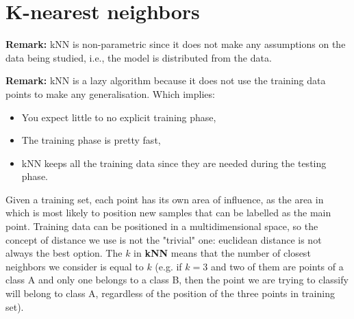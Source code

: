 \chapter{K-nearest neighbors}
\label{cha:KNN}


\textbf{Remark:} kNN is non-parametric since it does not make any assumptions on
the data being studied, i.e., the model is distributed from the data.
\newline

\textbf{Remark:} kNN is a lazy algorithm because it does not use the training data
points to make any generalisation. Which implies:
\begin{itemize}
	\item You expect little to no explicit training phase,

	\item The training phase is pretty fast,

	\item kNN keeps all the training data since they are needed during the testing
		phase.
\end{itemize}

Given a training set, each point has its own area of influence, as the area in
which is most likely to position new samples that can be labelled as the main
point. Training data can be positioned in a multidimensional space, so the
concept of distance we use is not the "trivial" one: euclidean distance is not always
the best option. The $k$ in \textbf{kNN} means that the number of closest neighbors
we consider is equal to $k$ (e.g. if $k=3$ and two of them are points of a class
A and only one belongs to a class B, then the point we are trying to classify
will belong to class A, regardless of the position of the three points in training
set).\\



